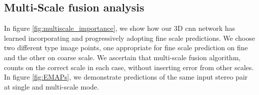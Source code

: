 \documentclass[10pt]{article}
\begin{document}
\subsection{Multi-Scale fusion analysis} \label{sec:4_1}

In figure \ref{fig:multiscale_importance}, we show how our 3D cnn network has learned incorporating and progressively adopting fine scale predictions. We choose two different type image points, one appropriate for fine scale prediction on fine and the other on coarse scale. We ascertain that multi-scale fusion algorithm, counts on the correct scale in each case, without inserting error from other scales. In figure \ref{fig:EMAPs}, we demonstrate predictions of the same input stereo pair at single and multi-scale mode.  

\end{document}
